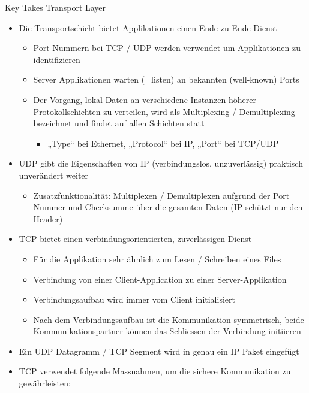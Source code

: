 \begin{KR}{Key Takes Transport Layer}
    \begin{itemize}
        \item Die Transportschicht bietet Applikationen einen Ende-zu-Ende Dienst
        \begin{itemize}
            \item Port Nummern bei TCP / UDP werden verwendet um Applikationen zu identifizieren
            \item Server Applikationen warten (=listen) an bekannten (well-known) Ports
            \item Der Vorgang, lokal Daten an verschiedene Instanzen höherer Protokollschichten zu verteilen, wird als Multiplexing / Demultiplexing bezeichnet und findet auf allen Schichten statt
            \begin{itemize}
                \item „Type“ bei Ethernet, „Protocol“ bei IP, „Port“ bei TCP/UDP
            \end{itemize}
        \end{itemize}
        \item UDP gibt die Eigenschaften von IP (verbindungslos, unzuverlässig) praktisch unverändert weiter
        \begin{itemize}
            \item Zusatzfunktionalität: Multiplexen / Demultiplexen aufgrund der Port Nummer und Checksumme über die gesamten Daten (IP schützt nur den Header)
        \end{itemize}
        \item TCP bietet einen verbindungsorientierten, zuverlässigen Dienst
        \begin{itemize}
            \item Für die Applikation sehr ähnlich zum Lesen / Schreiben eines Files
            \item Verbindung von einer Client-Application zu einer Server-Applikation
            \item Verbindungsaufbau wird immer vom Client initialisiert
            \item Nach dem Verbindungsaufbau ist die Kommunikation symmetrisch, beide Kommunikationspartner können das Schliessen der Verbindung initiieren
        \end{itemize}
        \item Ein UDP Datagramm / TCP Segment wird in genau ein IP Paket eingefügt
        \item TCP verwendet folgende Massnahmen, um die sichere Kommunikation zu gewährleisten:

\end{itemize}
\end{KR}

